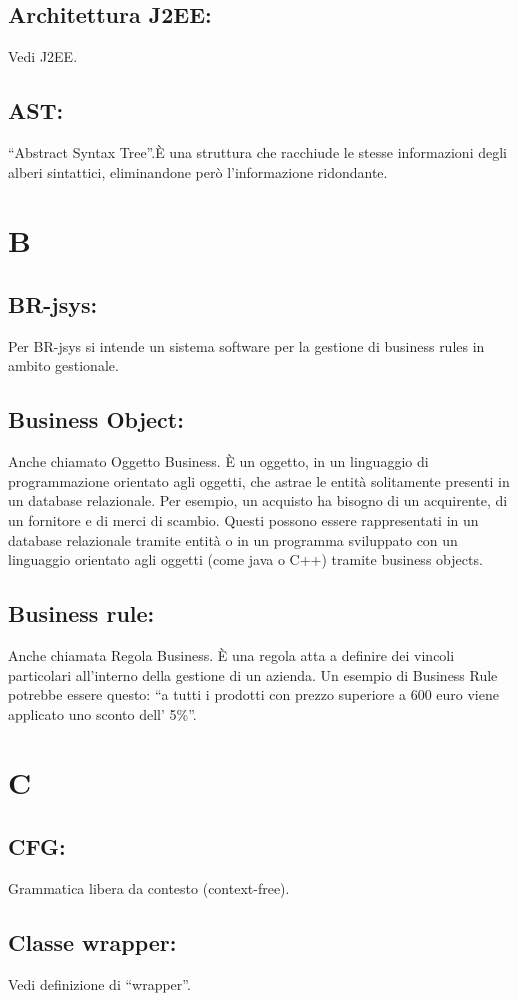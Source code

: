 \section{Architettura J2EE:}
Vedi J2EE.
\section{AST:} 
``Abstract Syntax Tree''.\`E una struttura che racchiude le stesse informazioni degli alberi sintattici, eliminandone per\`o l'informazione ridondante.

\chapter{B}
\section{BR-jsys:}
Per BR-jsys si intende un sistema software per la gestione di business rules in ambito gestionale.
\section{Business Object:}
Anche chiamato Oggetto Business. \`E un oggetto, in un linguaggio di programmazione orientato agli oggetti, che astrae le entit\`a solitamente presenti in un database relazionale.
Per esempio, un acquisto ha bisogno di un acquirente, di un fornitore e di merci di scambio. Questi possono essere rappresentati in un database relazionale tramite entit\`a o in un programma sviluppato con un linguaggio orientato agli oggetti (come java o C++) tramite business objects.
\section{Business rule:}
Anche chiamata Regola Business. \`E una regola atta a definire dei vincoli particolari all'interno della gestione di un azienda. Un esempio di Business Rule potrebbe essere questo: ``a tutti i prodotti con prezzo superiore a 600 euro  viene applicato uno sconto dell' 5\%''.

\chapter{C}
\section{CFG:}
Grammatica libera da contesto (context-free). 
\section{Classe wrapper:}
Vedi definizione di ``wrapper''.

